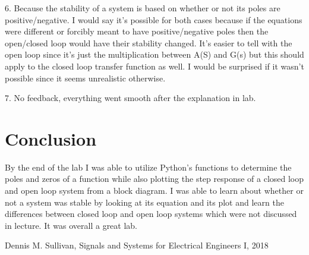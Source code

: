 \documentclass[12pt]{report}
\begin{document}
6. Because the stability of a system is based on whether or not its poles are positive/negative. I would say it's possible for both cases because if the equations were different or forcibly meant to have positive/negative poles then the open/closed loop would have their stability changed. It's easier to tell with the open loop since it's just the multiplication between A(S) and G(s) but this should apply to the closed loop transfer function as well. I would be surprised if it wasn't possible since it seems unrealistic otherwise. 

7. No feedback, everything went smooth after the explanation in lab. 

\section{Conclusion}

By the end of the lab I was able to utilize Python's functions to determine the poles and zeros of a function while also plotting the step response of a closed loop and open loop system from a block diagram. I was able to learn about whether or not a system was stable by looking at its equation and its plot and learn the differences between closed loop and open loop systems which were not discussed in lecture. It was overall a great lab. 

\newpage


\begin{thebibliography}{111}
Dennis M. Sullivan,
Signals and Systems for Electrical Engineers I,
 2018
\end{thebibliography}
\end{document}
